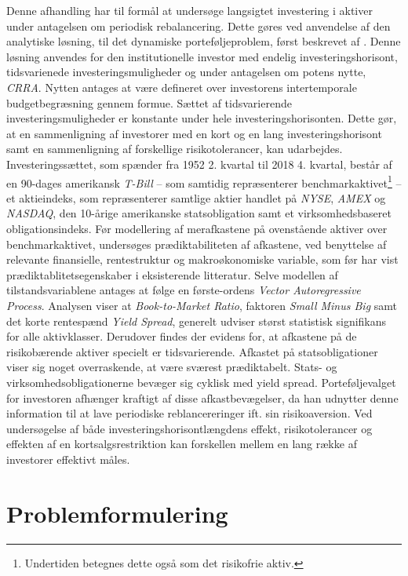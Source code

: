 \documentclass[
  a4paper,
  oneside]{memoir}
\begin{document}
Denne afhandling har til formål at undersøge langsigtet investering i aktiver under antagelsen om periodisk rebalancering. Dette gøres ved anvendelse af den analytiske løsning, til det dynamiske porteføljeproblem, først beskrevet af \citep{JurVic2011}. Denne løsning anvendes for den institutionelle investor med endelig investeringshorisont, tidsvarienede investeringsmuligheder og under antagelsen om potens nytte, \emph{CRRA}. Nytten antages at være defineret over investorens intertemporale budgetbegræsning gennem formue. Sættet af tidsvarierende investeringsmuligheder er konstante under hele investeringshorisonten. Dette gør, at en sammenligning af investorer med en kort og en lang investeringshorisont samt en sammenligning af forskellige risikotolerancer, kan udarbejdes. Investeringssættet, som spænder fra 1952 2. kvartal til 2018 4. kvartal, består af en 90-dages amerikansk \emph{T-Bill} -- som samtidig repræsenterer benchmarkaktivet\footnote{Undertiden betegnes dette også som det risikofrie aktiv.} -- et aktieindeks, som repræsenterer samtlige aktier handlet på \emph{NYSE}, \emph{AMEX} og \emph{NASDAQ}, den 10-årige amerikanske statsobligation samt et virksomhedsbaseret obligationsindeks. Før modellering af merafkastene på ovenstående aktiver over benchmarkaktivet, undersøges prædiktabiliteten af afkastene, ved benyttelse af relevante finansielle, rentestruktur og makroøkonomiske variable, som før har vist prædiktablitetsegenskaber i eksisterende litteratur. Selve modellen af tilstandsvariablene antages at følge en første-ordens \emph{Vector Autoregressive Process}. Analysen viser at \emph{Book-to-Market Ratio}, faktoren \emph{Small Minus Big} samt det korte rentespænd \emph{Yield Spread}, generelt udviser størst statistisk signifikans for alle aktivklasser. Derudover findes der evidens for, at afkastene på de risikobærende aktiver specielt er tidsvarierende. Afkastet på statsobligationer viser sig noget overraskende, at være sværest prædiktabelt. Stats- og virksomhedsobligationerne bevæger sig cyklisk med yield spread. Porteføljevalget for investoren afhænger kraftigt af disse afkastbevægelser, da han udnytter denne information til at lave periodiske reblancereringer ift. sin risikoaversion. Ved undersøgelse af både investeringshorisontlængdens effekt, risikotolerancer og effekten af en kortsalgsrestriktion kan forskellen mellem en lang række af investorer effektivt måles.

\hypertarget{problemformulering}{%
\section{Problemformulering}\label{problemformulering}}
\end{document}
